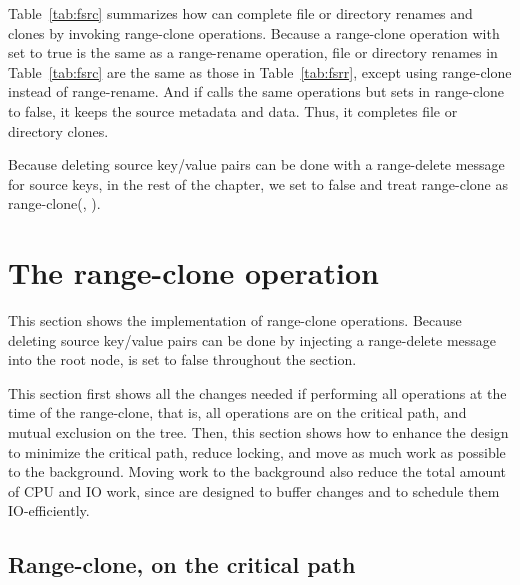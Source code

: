Table~\ref{tab:fsrc} summarizes how \betrfs can complete file or directory
renames and clones by invoking range-clone operations.
Because a range-clone operation with \delold set to true is the same as a
range-rename operation,
file or directory renames in Table~\ref{tab:fsrc} are the same as those in
Table~\ref{tab:fsrr}, except using range-clone instead of range-rename.
And if \betrfs calls the same operations but sets \delold in range-clone to
false,
it keeps the source metadata and data.
Thus, it completes file or directory clones.

Because deleting source key/value pairs can be done with a range-delete message
for source keys,
in the rest of the chapter, we set \delold to false and treat range-clone as
range-clone(\spre, \dpre).

\section{The range-clone operation}

This section shows the implementation of range-clone operations.
Because deleting source key/value pairs can be done by injecting a range-delete
message into the root node,
\delold is set to false throughout the section.

This section first shows all the changes needed if performing all operations
at the time of the range-clone, that is, all operations are on the critical
path, and mutual exclusion on the tree.
Then, this section shows how to enhance the design to minimize the critical
path, reduce locking, and move as much work as possible to the background.
Moving work to the background also reduce the total amount of CPU and IO work,
since \bets are designed to buffer changes and to schedule them IO-efficiently.

\subsection{Range-clone, on the critical path}

